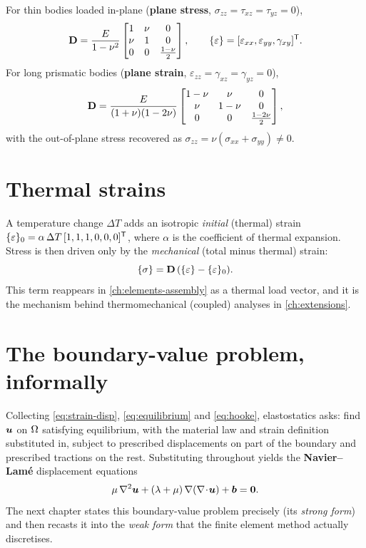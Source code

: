 For thin bodies loaded in-plane (\textbf{plane stress},
$\sigma_{zz}=\tau_{xz}=\tau_{yz}=0$),
\begin{equation}
  \mathbf{D} = \frac{E}{1-\nu^2}
  \begin{bmatrix} 1 & \nu & 0\\ \nu & 1 & 0\\ 0 & 0 & \tfrac{1-\nu}{2}\end{bmatrix},
  \qquad \{\varepsilon\}=[\varepsilon_{xx},\varepsilon_{yy},\gamma_{xy}]^{\mathsf{T}} .
\end{equation}
For long prismatic bodies (\textbf{plane strain},
$\varepsilon_{zz}=\gamma_{xz}=\gamma_{yz}=0$),
\begin{equation}
  \mathbf{D} = \frac{E}{(1+\nu)(1-2\nu)}
  \begin{bmatrix} 1-\nu & \nu & 0\\ \nu & 1-\nu & 0\\ 0 & 0 & \tfrac{1-2\nu}{2}\end{bmatrix},
\end{equation}
with the out-of-plane stress recovered as
$\sigma_{zz}=\nu(\sigma_{xx}+\sigma_{yy})\neq 0$.

\section{Thermal strains}

A temperature change $\Delta T$ adds an isotropic \emph{initial}
(thermal) strain $\{\varepsilon\}_0=\alpha\,\Delta T\,[1,1,1,0,0,0]^{\mathsf{T}}$,
where $\alpha$ is the coefficient of thermal expansion. Stress is then
driven only by the \emph{mechanical} (total minus thermal) strain:
\begin{equation}
  \{\sigma\} = \mathbf{D}\,(\{\varepsilon\}-\{\varepsilon\}_0).
  \label{eq:thermal-strain}
\end{equation}
This term reappears in \cref{ch:elements-assembly} as a thermal load
vector, and it is the mechanism behind thermomechanical (coupled)
analyses in \cref{ch:extensions}.

\section{The boundary-value problem, informally}

Collecting \eqref{eq:strain-disp}, \eqref{eq:equilibrium} and
\eqref{eq:hooke}, elastostatics asks: find $\bm{u}$ on $\Omega$
satisfying equilibrium, with the material law and strain definition
substituted in, subject to prescribed displacements on part of the
boundary and prescribed tractions on the rest. Substituting throughout
yields the \textbf{Navier--Lam\'e} displacement equations
\begin{equation}
  \mu\,\nabla^2\bm{u} + (\lambda+\mu)\,\nabla(\nabla\!\cdot\!\bm{u}) + \bm{b} = \bm{0} .
  \label{eq:navier}
\end{equation}
The next chapter states this boundary-value problem precisely (its
\emph{strong form}) and then recasts it into the \emph{weak form} that
the finite element method actually discretises.
